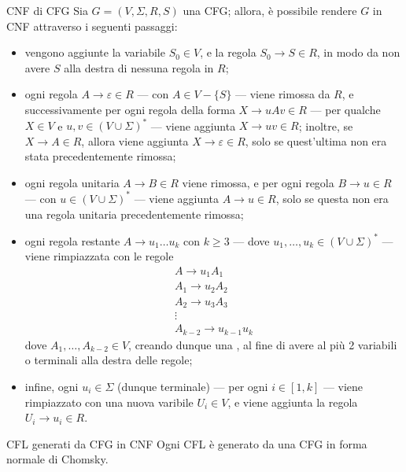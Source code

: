 \documentclass[a4paper, 12pt]{report}
\begin{document}
    \begin{framedmeth}[label={cfg into cnf}]{CNF di CFG}
        Sia $G = (V, \Sigma, R, S)$ una CFG; allora, è possibile rendere $G$ in CNF attraverso i seguenti passaggi:

        \begin{itemize}
            \item vengono aggiunte la variabile $S_0 \in V$, e la regola $S_0 \to S \in R$, in modo da non avere $S$ alla destra di nessuna regola in $R$;
            \item ogni regola $A \to \varepsilon \in R$ --- con $A \in V - \{S\}$ --- viene rimossa da $R$, e successivamente per ogni regola della forma $X \to uAv \in R$ --- per qualche $X \in V$ e $u, v \in (V \cup \Sigma)^*$ --- viene aggiunta $X \to uv \in R$; inoltre, se $X \to A \in R$, allora viene aggiunta $X \to \varepsilon \in R$, solo se quest'ultima non era stata precedentemente rimossa;
            \item ogni regola unitaria $A \to B \in R$ viene rimossa, e per ogni regola $B \to u \in R$ --- con $u \in (V \cup \Sigma)^*$ --- viene aggiunta $A \to u \in R$, solo se questa non era una regola unitaria precedentemente rimossa;
            \item ogni regola restante $A \to u_1 \ldots u_k$ con $k \ge 3$ --- dove $u_1, \ldots, u_k \in (V \cup \Sigma)^*$ --- viene rimpiazzata con le regole $$\left . \begin{array}{c} A \to u_1 A_1  \\ A_1 \to u_2 A_2 \\ A_2 \to u_3 A_3 \\ \vdots \\ A_{k - 2} \to u_{k - 1}u_k \end{array} \right .$$ dove $A_1, \ldots, A_{k - 2} \in V$, creando dunque una , al fine di avere al più 2 variabili o terminali alla destra delle regole;
            \item infine, ogni $u_i \in \Sigma$ (dunque terminale) --- per ogni $i \in [1, k]$ --- viene rimpiazzato con una nuova varibile $U_i \in V$, e viene aggiunta la regola $U_i \to u_i \in R$.
        \end{itemize}
    \end{framedmeth}

    \begin{framedlem}{CFL generati da CFG in CNF}
        Ogni CFL è generato da una CFG in forma normale di Chomsky.
    \end{framedlem}
\end{document}
